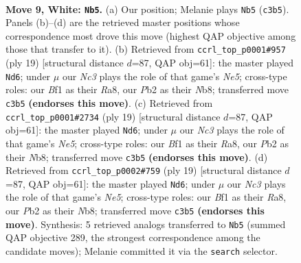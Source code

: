 \documentclass[11pt]{article}
\begin{document}
\clearpage

\begin{figure}[p]\centering
\begin{subfigure}{0.46\textwidth}\centering
\resizebox{\linewidth}{!}{%
\newchessgame
\chessboard[
  setfen={rnb1k2r/pppnq1p1/4p3/3pPp1p/3P1P2/2N4N/PPP3PP/R2QKB1R w KQkq f6 0 9},
  showmover=false,
  pgfstyle=straightmove, color=movearrow, markmove={c3-b5}
]}
\caption{}
\end{subfigure}\hfill
\begin{subfigure}{0.46\textwidth}\centering
\resizebox{\linewidth}{!}{%
\newchessgame
\chessboard[
  setfen={rnbqk2r/1p3ppp/2p1p3/p7/P1pPn3/5NP1/1P2PPBP/RNQ1K2R b KQkq - 2 10},
  showmover=false,
  pgfstyle=straightmove, color=movearrow, markmove={e4-d6}
]}
\caption{}
\end{subfigure}
\\[4pt]
\begin{subfigure}{0.46\textwidth}\centering
\resizebox{\linewidth}{!}{%
\newchessgame
\chessboard[
  setfen={rnbqk2r/1p3ppp/2p1p3/p7/P1pPn3/5NP1/1P2PPBP/RNQ1K2R b KQkq - 2 10},
  showmover=false,
  pgfstyle=straightmove, color=movearrow, markmove={e4-d6}
]}
\caption{}
\end{subfigure}\hfill
\begin{subfigure}{0.46\textwidth}\centering
\resizebox{\linewidth}{!}{%
\newchessgame
\chessboard[
  setfen={rnbqk2r/1p3ppp/2p1p3/p7/P1pPn3/5NP1/1P2PPBP/RNQ1K2R b KQkq - 2 10},
  showmover=false,
  pgfstyle=straightmove, color=movearrow, markmove={e4-d6}
]}
\caption{}
\end{subfigure}
\caption{\textbf{Move 9, White: \texttt{Nb5}.} (a) Our position; Melanie plays \texttt{Nb5} (\texttt{c3b5}). Panels (b)--(d) are the retrieved master positions whose correspondence most drove this move (highest QAP objective among those that transfer to it). (b) Retrieved from \texttt{ccrl\_top\_p0001\#957} (ply 19) [structural distance $d$=87, QAP obj=61]: the master played \texttt{Nd6}; under $\mu$ our \emph{Nc3} plays the role of that game's \emph{Ne5}; cross-type roles: our \emph{B}f1 as their \emph{R}a8, our \emph{P}b2 as their \emph{N}b8; transferred move \texttt{c3b5} \textbf{(endorses this move)}. (c) Retrieved from \texttt{ccrl\_top\_p0001\#2734} (ply 19) [structural distance $d$=87, QAP obj=61]: the master played \texttt{Nd6}; under $\mu$ our \emph{Nc3} plays the role of that game's \emph{Ne5}; cross-type roles: our \emph{B}f1 as their \emph{R}a8, our \emph{P}b2 as their \emph{N}b8; transferred move \texttt{c3b5} \textbf{(endorses this move)}. (d) Retrieved from \texttt{ccrl\_top\_p0002\#759} (ply 19) [structural distance $d$=87, QAP obj=61]: the master played \texttt{Nd6}; under $\mu$ our \emph{Nc3} plays the role of that game's \emph{Ne5}; cross-type roles: our \emph{B}f1 as their \emph{R}a8, our \emph{P}b2 as their \emph{N}b8; transferred move \texttt{c3b5} \textbf{(endorses this move)}. Synthesis: 5 retrieved analogs transferred to \texttt{Nb5} (summed QAP objective 289, the strongest correspondence among the candidate moves); Melanie committed it via the \texttt{search} selector.}
\label{fig:thought-m16}
\end{figure}
\end{document}
